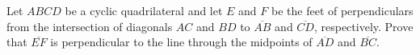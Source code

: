 Let $ABCD$ be a cyclic quadrilateral and let $E$ and $F$ be the feet of perpendiculars from the intersection of diagonals $AC$ and $BD$ to $\overline{AB}$ and $\overline{CD}$, respectively. Prove that $\overline{EF}$ is perpendicular to the line through the midpoints of $\overline{AD}$ and $\overline{BC}$.